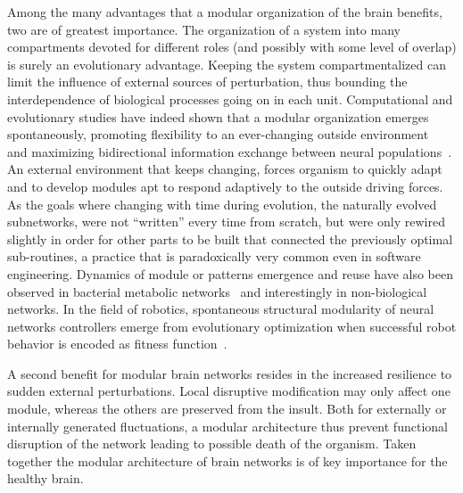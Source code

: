Among the many advantages that a modular organization of the brain benefits, two are of greatest importance. The organization of a system into many compartments devoted for different roles (and possibly with some level of overlap) is surely an evolutionary advantage. 
Keeping the system compartmentalized can limit the influence of external sources of perturbation, thus bounding the interdependence of biological processes going on in each unit. Computational and evolutionary studies have indeed shown that a modular organization emerges spontaneously, promoting flexibility to an ever-changing outside environment~\cite{kashtan2005,kashtan2007} and maximizing bidirectional information exchange between neural populations~\cite{yamaguti2015}.
An external environment that keeps changing, forces organism to quickly adapt and to develop modules apt to respond adaptively to the outside driving forces.
As the goals where changing with time during evolution, the naturally evolved subnetworks, were not ``written'' every time from scratch, but were only rewired slightly in order for other parts to be built that connected the previously optimal sub-routines, a practice that is paradoxically very common even in software engineering. 
Dynamics of module or patterns emergence and reuse have also been observed in bacterial metabolic networks~\cite{kreimer2008} and interestingly in non-biological networks. In the field of robotics, spontaneous structural modularity of neural networks controllers emerge from evolutionary optimization when successful robot behavior is encoded as fitness function~\cite{bongard2011}.

A second benefit for modular brain networks resides in the increased resilience to sudden external perturbations. Local disruptive modification may only affect one module, whereas the others are preserved from the insult. Both for externally or internally generated fluctuations, a modular architecture thus prevent functional disruption of the network leading to possible death of the organism. Taken together the modular architecture of brain networks is of key importance for the healthy brain.


